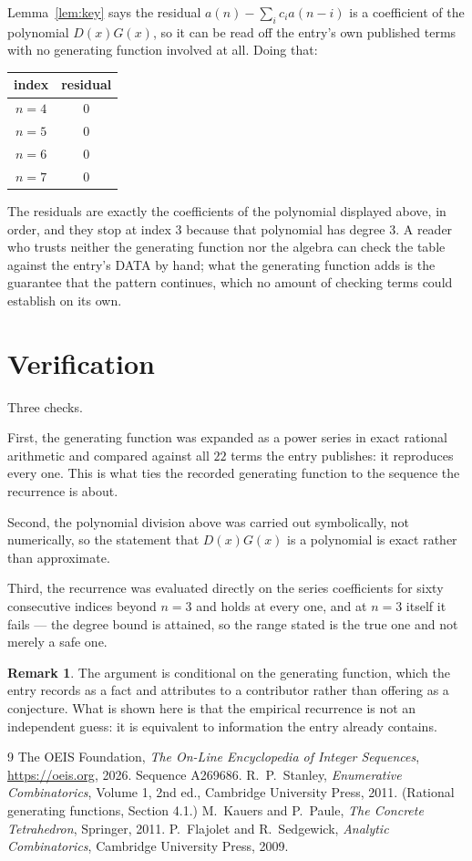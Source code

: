 \documentclass[11pt,a4paper]{article}
\theoremstyle{plain}
\theoremstyle{definition}
\newtheorem{remark}[theorem]{Remark}
\begin{document}
Lemma~\ref{lem:key} says the residual $a(n)-\sum_ic_ia(n-i)$ is a coefficient of the
polynomial $D(x)G(x)$, so it can be read off the entry's own published terms with no
generating function involved at all. Doing that:
\begin{center}
\begin{tabular}{cc}
index & residual \\ \hline
$n=4$ & $0$ \\
$n=5$ & $0$ \\
$n=6$ & $0$ \\
$n=7$ & $0$
\end{tabular}
\end{center}
The residuals are exactly the coefficients of the polynomial displayed above, in order, and
they stop at index $3$ because that polynomial has degree $3$. A reader who trusts
neither the generating function nor the algebra can check the table against the entry's DATA
by hand; what the generating function adds is the guarantee that the pattern continues, which
no amount of checking terms could establish on its own.

\section{Verification}

Three checks.

First, the generating function was expanded as a power series in exact rational arithmetic and
compared against all $22$ terms the entry publishes: it reproduces every one. This is
what ties the recorded generating function to the sequence the recurrence is about.

Second, the polynomial division above was carried out symbolically, not numerically, so the
statement that $D(x)G(x)$ is a polynomial is exact rather than approximate.

Third, the recurrence was evaluated directly on the series coefficients for sixty consecutive
indices beyond $n=3$ and holds at every one, and at $n=3$ itself it fails --- the
degree bound is attained, so the range stated is the true one and not merely a safe one.

\begin{remark}
The argument is conditional on the generating function, which the entry records as a fact and
attributes to a contributor rather than offering as a conjecture. What is shown here is that
the empirical recurrence is not an independent guess: it is equivalent to information the
entry already contains.
\end{remark}

\begin{thebibliography}{9}
 The OEIS Foundation, \emph{The On-Line Encyclopedia of Integer
Sequences}, \url{https://oeis.org}, 2026. Sequence A269686.
 R.~P.~Stanley, \emph{Enumerative Combinatorics}, Volume 1, 2nd ed.,
Cambridge University Press, 2011. (Rational generating functions, Section 4.1.)
 M.~Kauers and P.~Paule, \emph{The Concrete Tetrahedron}, Springer, 2011.
 P.~Flajolet and R.~Sedgewick, \emph{Analytic Combinatorics}, Cambridge
University Press, 2009.
\end{thebibliography}
\end{document}
